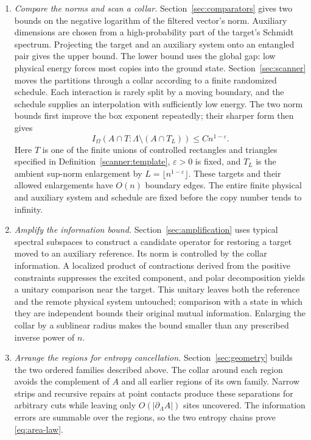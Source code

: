 \begin{enumerate}[leftmargin=*,label=\arabic*.]
\item \emph{Compare the norms and scan a collar.}
Section~\ref{sec:comparators} gives two bounds on the negative logarithm
of the filtered vector's norm. Auxiliary dimensions are chosen from a
high-probability part of the target's Schmidt spectrum. Projecting the
target and an auxiliary system onto an entangled pair gives the upper
bound. The lower bound uses the global gap: low physical energy forces
most copies into the ground state.
Section~\ref{sec:scanner} moves the partitions through a collar according
to a finite randomized schedule. Each interaction is rarely split by a
moving boundary, and the schedule supplies an interpolation with sufficiently
low energy. The two norm bounds first improve the box exponent repeatedly;
their sharper form then gives
\[
 I_\Omega(A\cap T:\Lambda\setminus(A\cap T_L))
       \le Cn^{1-\varepsilon}.
\]
Here $T$ is one of the finite unions of controlled rectangles and triangles
specified in Definition~\ref{scanner:template}, $\varepsilon>0$ is fixed,
and $T_L$ is the ambient sup-norm enlargement by
$L=\lfloor n^{1-\varepsilon}\rfloor$. These targets and their allowed
enlargements have $O(n)$ boundary edges. The entire finite physical and
auxiliary system and schedule are fixed before the copy number tends to infinity.

\item \emph{Amplify the information bound.}
Section~\ref{sec:amplification} uses typical spectral subspaces to
construct a candidate operator for restoring a target moved to an auxiliary
reference. Its norm is controlled by the collar information. A localized
product of contractions derived from the positive constraints suppresses
the excited component, and polar decomposition yields a unitary comparison near the target. This unitary
leaves both the reference and the remote physical system untouched;
comparison with a state in which they are independent bounds their
original mutual information. Enlarging the collar by a sublinear radius
makes the bound smaller than any prescribed inverse power of $n$.

\item \emph{Arrange the regions for entropy cancellation.}
Section~\ref{sec:geometry} builds the two ordered families described above.
The collar around each region avoids the complement of $A$ and all earlier
regions of its own family. Narrow strips and recursive repairs at point
contacts produce these separations for arbitrary cuts while leaving only
$O(|\partial_\Lambda A|)$ sites uncovered. The information errors are
summable over the regions, so the two entropy chains prove
\eqref{eq:area-law}.
\end{enumerate}
